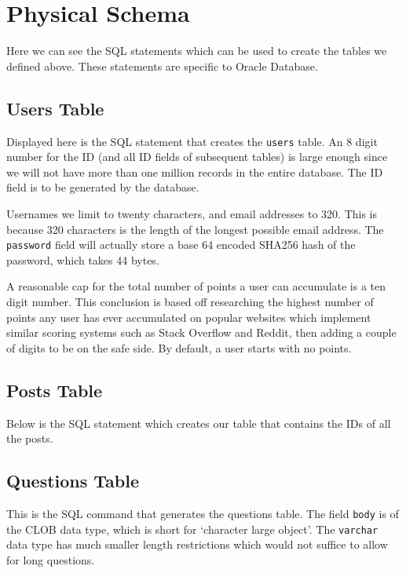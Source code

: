 \section{Physical Schema}

Here we can see the SQL statements which can be used to create the tables we defined above. These statements are specific to Oracle Database.

\subsection{Users Table}

Displayed here is the SQL statement that creates the \verb`users` table. An 8 digit number for the ID (and all ID fields of subsequent tables) is large enough since we will not have more than one million records in the entire database. The ID field is to be generated by the database.

Usernames we limit to twenty characters, and email addresses to 320. This is because 320 characters is the length of the longest possible email address. The \verb`password` field will actually store a base 64 encoded SHA256 hash of the password, which takes 44 bytes.

A reasonable cap for the total number of points a user can accumulate is a ten digit number. This conclusion is based off researching the highest number of points any user has ever accumulated on popular websites which implement similar scoring systems such as Stack Overflow and Reddit, then adding a couple of digits to be on the safe side. By default, a user starts with no points.


\subsection{Posts Table}

Below is the SQL statement which creates our table that contains the IDs of all the posts.


\subsection{Questions Table}

This is the SQL command that generates the questions table. The field \verb`body` is of the CLOB data type, which is short for `character large object'. The \verb`varchar` data type has much smaller length restrictions which would not suffice to allow for long questions.

